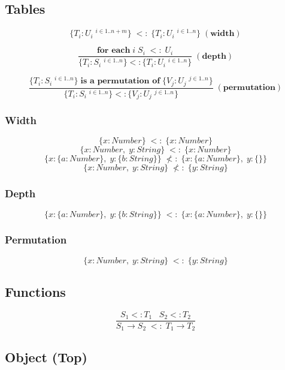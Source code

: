 \documentclass[12pt]{article}
\begin{document}
\subsection{Tables}

\[
\{T_{i}:U_{i} \; ^{i \in 1..n+m}\} \;
<: \;
\{T_{i}:U_{i} \; ^{i \in 1..n}\} \; (\textbf{width})
\]

\[
\frac{\textbf{for each} \; i \; S_{i} \; <: \; U_{i}}
     {\{T_{i}:S_{i} \; ^{i \in 1..n}\}
       <:
       \{T_{i}:U_{i} \; ^{i \in 1..n}\}} \; (\textbf{depth})
\]

\[
\frac{\{T_{i}:S_{i} \; ^{i \in 1..n}\} \;
       \textbf{is a permutation of} \;
       \{V_{j}:U_{j} \; ^{j \in 1..n}\}}
     {\{T_{i}:S_{i} \; ^{i \in 1..n}\}
       <:
       \{V_{j}:U_{j} \; ^{j \in 1..n}\}} \; (\textbf{permutation})
\]

\subsubsection{Width}

\[
\{x:Number\} \; <: \; \{x:Number\}
\]
\[
\{x:Number, \; y:String\} \; <: \; \{x:Number\}
\]
\[
\{x:\{a:Number\}, \; y:\{b:String\}\} \;
\not<: \;
\{x:\{a:Number\}, \; y:\{\}\}
\]
\[
\{x:Number, \; y:String\} \; \not<: \; \{y:String\}
\]

\subsubsection{Depth}

\[
\{x:\{a:Number\}, \; y:\{b:String\}\} \;
<: \;
\{x:\{a:Number\}, \; y:\{\}\}
\]

\subsubsection{Permutation}

\[
\{x:Number, \; y:String\} \; <: \; \{y:String\}
\]

\subsection{Functions}

\[
\frac{S_{1} <: T_{1} \;\;\; S_{2} <: T_{2}}
     {S_{1} \rightarrow S_{2} \; <: \; T_{1} \rightarrow T_{2}}
\]

\subsection{Object (Top)}
\end{document}
